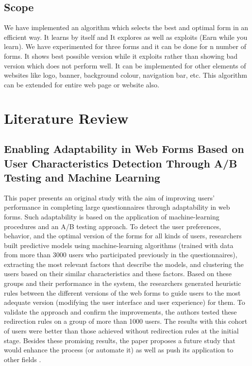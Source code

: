 \documentclass[12pt]{report}
\begin{document}
\section{Scope}
We have implemented an algorithm which selects the best and optimal form in an efficient way. It learns by itself and It explores as well as exploits (Earn while you learn). We have experimented for three forms and it can be done for n number of forms.  It shows best possible version while it exploits rather than showing bad version which does not perform well. It can be implemented for other elements of websites like logo, banner, background colour, navigation bar, etc. This algorithm can be extended for entire web page or website also.  



\newpage
\chapter{Literature Review}
\section{Enabling Adaptability in Web Forms Based on User Characteristics Detection Through A/B Testing and Machine Learning}
This paper presents an original study with the aim of improving users' performance in completing large questionnaires through adaptability in web forms. Such adaptability is based on the application of machine-learning procedures and an A/B testing approach. To detect the user preferences, behavior, and the optimal version of the forms for all kinds of users, researchers built predictive models using machine-learning algorithms (trained with data from more than 3000 users who participated previously in the questionnaires), extracting the most relevant factors that describe the models, and clustering the users based on their similar characteristics and these factors. Based on these groups and their performance in the system, the researchers generated heuristic rules between the different versions of the web forms to guide users to the most adequate version (modifying the user interface and user experience) for them. To validate the approach and confirm the improvements, the authors tested these redirection rules on a group of more than 1000 users. The results with this cohort of users were better than those achieved without redirection rules at the initial stage. Besides these promising results, the paper proposes a future study that would enhance the process (or automate it) as well as push its application to other fields
\cite{cruz2018enabling}.
\newpage
\end{document}
